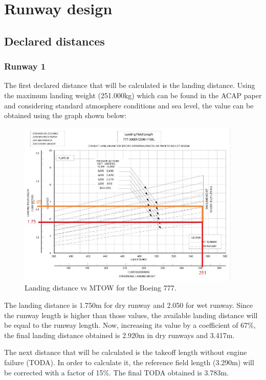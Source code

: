 \chapter{Runway design}

	\section{Declared distances}
		\subsection{Runway 1}
	
		The first declared distance that will be calculated is the landing distance. Using the maximum landing weight (251.000kg) which can be found in the ACAP paper and considering standard atmosphere conditions and sea level, the value can be obtained using the graph shown below: 
		
		\begin{figure}[H]
			\centering
			\includegraphics[clip, trim=0cm 0cm 0cm 0cm, width=0.95\textwidth]{./images/B777/landingdistance777}
			\caption{Landing distance vs MTOW for the Boeing 777.} %
			\label{} %
		\end{figure}
		
		The landing distance is 1.750m for dry runway and 2.050 for wet runway. Since the runway length is higher than those values, the available landing distance will be equal to the runway length.	Now, increasing its value by a coefficient of 67\%, the final landing distance obtained is 2.920m in dry runways and 3.417m. 
		
		The next distance that will be calculated is the takeoff length without engine failure (TODA). In order to calculate it, the reference field length (3.290m) will be corrected with a factor of 15\%.  The final TODA obtained is 3.783m.
		
